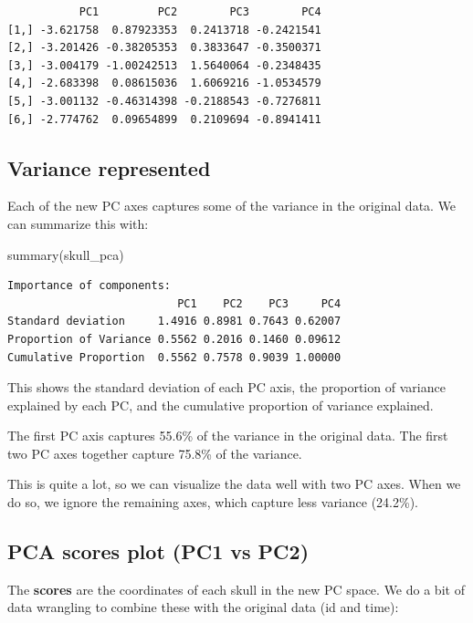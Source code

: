\documentclass[
  letterpaper,
  8pt,
  a4paper]{book}
\newenvironment{Shaded}{\begin{snugshade}}{\end{snugshade}}
\newcommand{\FunctionTok}[1]{\textcolor[rgb]{0.28,0.35,0.67}{#1}}
\newcommand{\NormalTok}[1]{\textcolor[rgb]{0.00,0.23,0.31}{#1}}
\begin{document}
\begin{verbatim}
           PC1         PC2        PC3        PC4
[1,] -3.621758  0.87923353  0.2413718 -0.2421541
[2,] -3.201426 -0.38205353  0.3833647 -0.3500371
[3,] -3.004179 -1.00242513  1.5640064 -0.2348435
[4,] -2.683398  0.08615036  1.6069216 -1.0534579
[5,] -3.001132 -0.46314398 -0.2188543 -0.7276811
[6,] -2.774762  0.09654899  0.2109694 -0.8941411
\end{verbatim}

\subsection*{Variance represented}\label{variance-represented}

Each of the new PC axes captures some of the variance in the original
data. We can summarize this with:

\begin{Shaded}
\begin{Highlighting}[]
\FunctionTok{summary}\NormalTok{(skull\_pca)}
\end{Highlighting}
\end{Shaded}

\begin{verbatim}
Importance of components:
                          PC1    PC2    PC3     PC4
Standard deviation     1.4916 0.8981 0.7643 0.62007
Proportion of Variance 0.5562 0.2016 0.1460 0.09612
Cumulative Proportion  0.5562 0.7578 0.9039 1.00000
\end{verbatim}

This shows the standard deviation of each PC axis, the proportion of
variance explained by each PC, and the cumulative proportion of variance
explained.

The first PC axis captures 55.6\% of the variance in the original data.
The first two PC axes together capture 75.8\% of the variance.

This is quite a lot, so we can visualize the data well with two PC axes.
When we do so, we ignore the remaining axes, which capture less variance
(24.2\%).

\subsection*{PCA scores plot (PC1 vs
PC2)}\label{pca-scores-plot-pc1-vs-pc2}

The \textbf{scores} are the coordinates of each skull in the new PC
space. We do a bit of data wrangling to combine these with the original
data (id and time):
\end{document}

